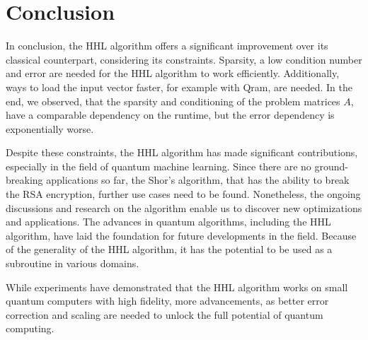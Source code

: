
\section{Conclusion}

In conclusion, the HHL algorithm offers a significant improvement over its classical counterpart, considering its constraints.
Sparsity, a low condition number and error are needed for the HHL algorithm to work efficiently.
Additionally, ways to load the input vector faster, for example with Qram, are needed. 
In the end, we observed, that the sparsity and conditioning of the problem matrices $A$, have a comparable dependency on the runtime, but the error dependency is exponentially worse. 

Despite these constraints, the HHL algorithm has made significant contributions, especially in the field of quantum machine learning. 
Since there are no ground-breaking applications so far, the Shor's algorithm, that has the ability to break the RSA encryption, further use cases need to be found.
Nonetheless, the ongoing discussions and research on the algorithm enable us to discover new optimizations and applications.
The advances in quantum algorithms, including the HHL algorithm, have laid the foundation for future developments in the field.
Because of the generality of the HHL algorithm, it has the potential to be used as a subroutine in various domains.

While experiments have demonstrated that the HHL algorithm works on small quantum computers with high fidelity, 
more advancements, as better error correction and scaling are needed to unlock the full potential of quantum computing.



